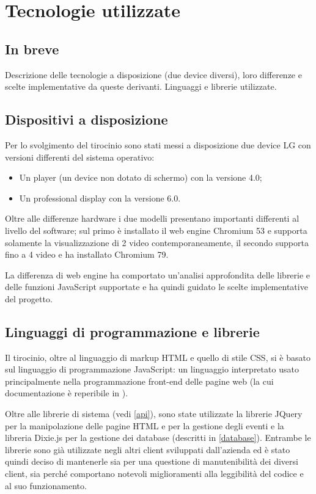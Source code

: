 \chapter{Tecnologie utilizzate}

\section{In breve}
Descrizione delle tecnologie a disposizione (due device diversi), loro differenze e scelte implementative da queste derivanti. Linguaggi e librerie utilizzate. 

\section{Dispositivi a disposizione}
Per lo svolgimento del tirocinio sono stati messi a disposizione due device LG con versioni differenti del sistema operativo:
\begin{itemize}
    \item Un player (un device non dotato di schermo) con la versione 4.0;
    \item Un professional display con la versione 6.0.
\end{itemize}

Oltre alle differenze hardware i due modelli presentano importanti differenti al livello del software; sul primo è installato il web engine Chromium 53 e supporta solamente la visualizzazione di 2 video contemporaneamente, il secondo supporta fino a 4 video e ha installato Chromium 79.

La differenza di web engine ha comportato un'analisi approfondita delle librerie e delle funzioni JavaScript supportate e ha quindi guidato le scelte implementative del progetto.


\section{Linguaggi di programmazione e librerie}

Il tirocinio, oltre al linguaggio di markup HTML e quello di stile CSS, si è basato sul linguaggio di programmazione JavaScript: un linguaggio interpretato usato principalmente nella programmazione front-end delle pagine web (la cui documentazione è reperibile in \cite{MdN}).

Oltre alle librerie di sistema (vedi \ref{api}), sono state utilizzate la librerie JQuery \cite{jQDoc} per la manipolazione delle pagine HTML e per la gestione degli eventi e la libreria Dixie.js \cite{dixie} per la gestione dei database (descritti in \ref*{database}). Entrambe le librerie sono già utilizzate negli altri client sviluppati dall'azienda ed è stato quindi deciso di mantenerle sia per una questione di manutenibilità dei diversi client, sia perché comportano notevoli miglioramenti alla leggibilità del codice e al suo funzionamento.


